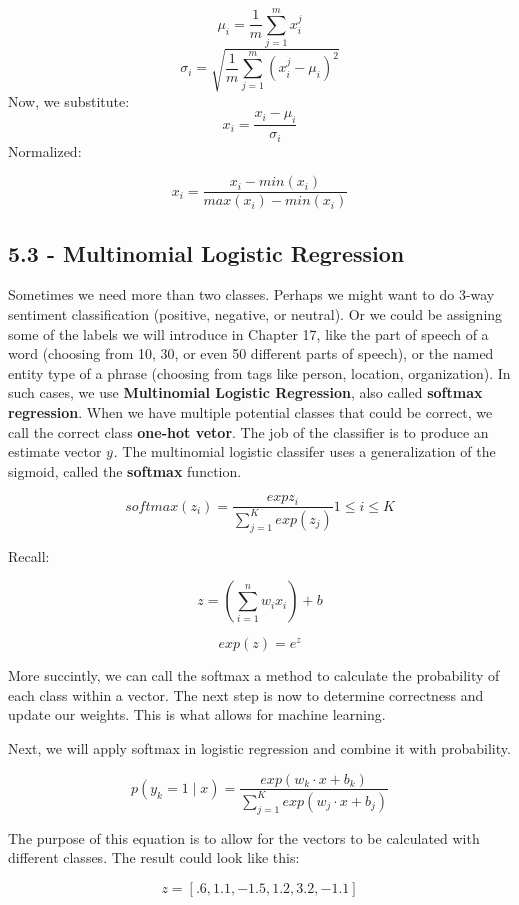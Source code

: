 \documentclass{article}
\begin{document}
\[
    \mu_i = \frac{1}{m}\sum_{j=1}^{m} x_{i}^{j}
\]
\[
    \sigma_i = \sqrt{\frac{1}{m}\sum_{j=1}^{m}(x_{i}^{j}-\mu_i)^2}
\]
Now, we substitute:
\[
    x_i = \frac{x_i - \mu_i}{\sigma_i}
\]
Normalized:

\[
    x_i = \frac{x_i - min(x_i)}{max(x_i) - min(x_i)}
\]

\subsection{5.3 - Multinomial Logistic Regression}

Sometimes we need more than two classes. Perhaps we might want to do 3-way
sentiment classification (positive, negative, or neutral). Or we could be assigning
some of the labels we will introduce in Chapter 17, like the part of speech of a word
(choosing from 10, 30, or even 50 different parts of speech), or the named entity
type of a phrase (choosing from tags like person, location, organization). In such cases, we
use \textbf{Multinomial Logistic Regression}, also called \textbf{softmax regression}. \newline
When we have multiple potential classes that could be correct, we call the correct class
\textbf{one-hot vetor}. The job of the classifier is to produce an estimate vector \textbf{$y^{\hat{}}$}.
The multinomial logistic classifer uses a generalization of the sigmoid, called the \textbf{softmax} function.

\[
    softmax(z_i) = \frac{expz_i}{\sum_{j=1}^{K}exp(z_j)} 1 \leq \textit{i} \leq K
\]

Recall:


\[
    z = (\sum_{i=1}^{n} w_i x_i) + b
\]

\[
    exp(z) = e^{z}
\]

More succintly, we can call the softmax a method to calculate the probability of each class within a vector.
The next step is now to determine correctness and update our weights. This is what allows for machine learning. \newline

Next, we will apply softmax in logistic regression and combine it with probability.

\[
    p(y_k = 1 \mid x) = \frac{exp(w_k \cdot x + b_k)}{\sum_{j=1}^{K} exp(w_j  \cdot  x + b_j)}
\]

The purpose of this equation is to allow for the vectors to be calculated with different classes. The result could look like this:

\[
    z =   [.6,1.1, -1.5, 1.2, 3.2, -1.1]
\]
\end{document}
